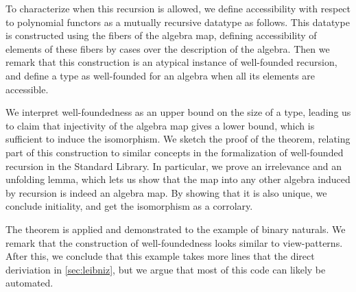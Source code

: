 \documentclass{article}
\theoremstyle{plain}%
\theoremstyle{definition}
\newcommand{\towrite}[1]{\todo[color=cyan]{#1}}
\begin{document}
To characterize when this recursion is allowed, we define accessibility with respect to polynomial functors as a mutually recursive datatype as follows. This datatype is constructed using the fibers of the algebra map, defining accessibility of elements of these fibers by cases over the description of the algebra. Then we remark that this construction is an atypical instance of well-founded recursion, and define a type as well-founded for an algebra when all its elements are accessible.

We interpret well-foundedness as an upper bound on the size of a type, leading us to claim that injectivity of the algebra map gives a lower bound, which is sufficient to induce the isomorphism. We sketch the proof of the theorem, relating part of this construction to similar concepts in the formalization of well-founded recursion in the Standard Library. In particular, we prove an irrelevance and an unfolding lemma, which lets us show that the map into any other algebra induced by recursion is indeed an algebra map. By showing that it is also unique, we conclude initiality, and get the isomorphism as a corrolary. 

The theorem is applied and demonstrated to the example of binary naturals. We remark that the construction of well-foundedness looks similar to view-patterns. After this, we conclude that this example takes more lines that the direct deriviation in \autoref{sec:leibniz}, but we argue that most of this code can likely be automated.

\towrite{Merge}


\end{document}
